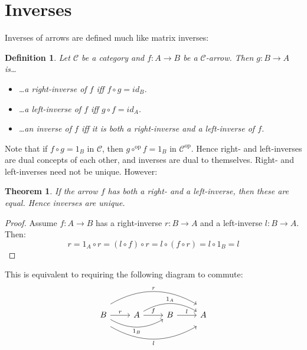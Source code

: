 \documentclass[12pt, a4paper]{article}
\newtheorem{theorem}{Theorem}[section]
\newtheorem{definition}{Definition}[section]
\numberwithin{equation}{section}
\begin{document}
\section{Inverses}
Inverses of arrows are defined much like matrix inverses:
\begin{definition}
Let $\mathcal{C}$ be a category and $f:A\rightarrow B$ be a $\mathcal{C}$-arrow. Then $g:B\rightarrow A$ is\ldots
\begin{itemize}
\item\ldots a right-inverse of $f$ iff $f\circ g=id_B$.
\item\ldots a left-inverse of $f$ iff $g\circ f=id_A$.
\item\ldots an inverse of $f$ iff it is both a right-inverse and a left-inverse of $f$.
\end{itemize}
\end{definition}
Note that if $f\circ g=1_B$ in $\mathcal{C}$, then $g\circ^{\textrm{op}} f=1_B$ in $\mathcal{C}^{\textrm{op}}$. Hence right- and left-inverses are dual concepts of each other, and inverses are dual to themselves. Right- and left-inverses need not be unique. However:
\begin{theorem}
If the arrow $f$ has both a right- and a left-inverse, then these are equal. Hence inverses are unique.
\end{theorem}
\begin{proof}
Assume $f:A\rightarrow B$ has a right-inverse $r:B\rightarrow A$ and a left-inverse $l:B\rightarrow A$. Then:
\begin{equation}
r=1_A\circ r=(l\circ f)\circ r=l\circ(f\circ r)=l\circ 1_B=l
\end{equation}
\end{proof}
This is equivalent to requiring the following diagram to commute:
\begin{equation*}
\begin{tikzcd}
B\arrow[r, "r"]\arrow[rr, swap, bend right, "1_B"]
\arrow[rrr, shift left = 2ex, bend left, "r"]
\arrow[rrr, shift right = 2ex, swap, bend right, "l"] &
A\arrow[r, "f"]\arrow[rr, bend left, "1_A"] &
B\arrow[r, "l"] &
A
\end{tikzcd}
\end{equation*}
\end{document}
